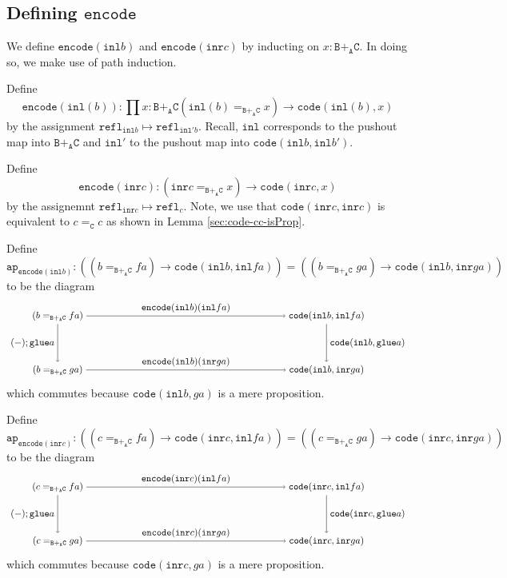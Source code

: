 \documentclass[12pt]{amsart}
\newcommand{\from}{\colon}
\newcommand{\type}[1]{\mathtt{#1}}
\newcommand{\tin}{\colon}
\newcommand{\A}{\type{A}}
\newcommand{\B}{\type{B}}
\newcommand{\C}{\type{C}}
\newcommand{\BAC}{\B +_{\A} \C}
\newcommand{\ap}{\type{ap}}
\newcommand{\inl}{\type{inl}}
\newcommand{\inr}{\type{inr}}
\newcommand{\glue}{\type{glue}}
\newcommand{\refl}{\type{refl}}
\newcommand{\code}{\type{code}}
\newcommand{\encode}{\type{encode}}
\theoremstyle{remark}
\theoremstyle{definition}
\begin{document}

\subsection{Defining \( \encode \)}
\label{sec:define-encode}

We define \( \encode ( \inl b ) \) and \( \encode ( \inr
c ) \) by inducting on \( x \tin \BAC \). In doing so, we make use of
path induction. 

Define 
\[
  \encode ( \inl (b) ) \from
  \prod\limits{ x \tin \BAC } ( \inl (b) =_{\BAC} x ) \to
  \code (\inl(b) , x)
\] 
by the assignment
%
\(
    \refl_{\inl b} \mapsto \refl_{\inl' b}.
\)
% 
Recall, \( \inl \) corresponds to the pushout map into \( \BAC \)
and \( \inl' \) to the pushout map into
\( \code ( \inl b , \inl b' ) \).

Define 
\[
  \encode ( \inr c ) \from
  ( \inr c =_{\BAC} x ) \to
  \code ( \inr c , x)
\] 
by the assignemnt
%
\(
    \refl_{ \inr c} \mapsto \refl_c.
\)
% 
Note, we use that
%
\(
    \code ( \inr c , \inr c )
\)
% 
is equivalent to \( c =_\C c \) as shown in Lemma
\ref{sec:code-cc-isProp}.

Define
\[
  \ap_{ \encode ( \inl b ) } \tin
  ( ( b =_{\BAC} fa ) \to \code ( \inl b , \inl fa ) ) =
  ( ( b =_{\BAC} ga ) \to \code ( \inl b , \inr ga ) )
\]
%
to be the diagram
%
\[
  \begin{tikzpicture}
    \node (1) at (-5,1) {\( ( b =_{\BAC} fa ) \)};
    \node (2) at (-5,-1) {\( ( b =_{\BAC} ga ) \)};
    \node (3) at (5,1) {\( \code ( \inl b , \inl fa ) \)};
    \node (4) at (5,-1) {\( \code ( \inl b , \inr ga ) \)};
    \draw [->] (1) to node [left]
      {\( (-) ; \glue a \)} (2);
    \draw [->] (1) to node [above]
      {\( \encode ( \inl b ) ( \inl fa ) \)} (3);
    \draw [->] (2) to node [above]
      {\( \encode ( \inl b ) ( \inr ga ) \)} (4);
    \draw [->] (3) to node [right]
      {\( \code ( \inl b , \glue a ) \)} (4); 
  \end{tikzpicture}
\]
%
which commutes because \( \code ( \inl b , ga ) \) is a mere proposition.
\par

Define
%
\[
  \ap_{ \encode ( \inr c ) } \tin
  ( ( c =_{\BAC} fa ) \to \code ( \inr c , \inl fa ) ) =
  ( ( c =_{\BAC} ga ) \to \code ( \inr c , \inr ga ) )
\]
%
to be the diagram
%
\[
  \begin{tikzpicture}
    \node (1) at (-5,1) {\( ( c =_{\BAC} fa ) \)};
    \node (2) at (-5,-1) {\( ( c =_{\BAC} ga ) \)};
    \node (3) at (5,1) {\( \code ( \inr c , \inl fa ) \)};
    \node (4) at (5,-1) {\( \code ( \inr c , \inr ga ) \)};
    \draw [->] (1) to node [left]
      {\( (-) ; \glue a \)} (2);
    \draw [->] (1) to node [above]
      {\( \encode ( \inr c ) ( \inl fa ) \)} (3);
    \draw [->] (2) to node [above]
      {\( \encode ( \inr c ) ( \inr ga ) \)} (4);
    \draw [->] (3) to node [right]
      {\( \code ( \inr c , \glue a ) \)} (4); 
  \end{tikzpicture}
\]
%
which commutes because \( \code ( \inr c , ga ) \) is a mere proposition.
\par
\end{document}
